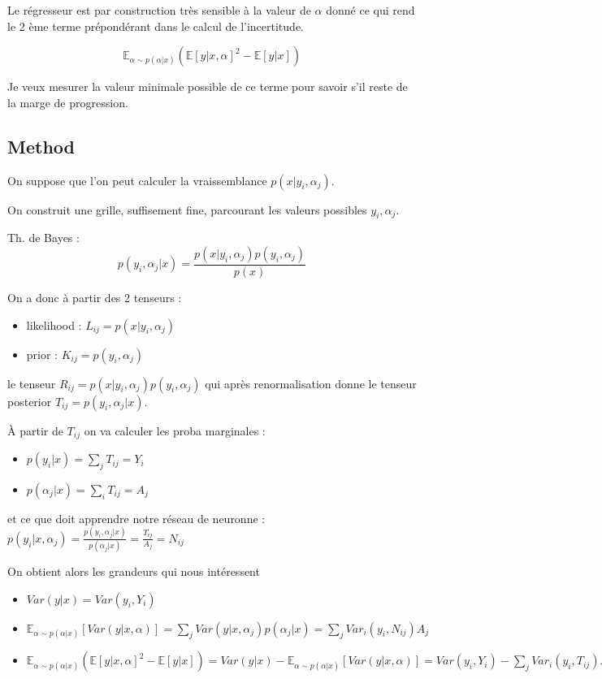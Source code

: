 Le régresseur est par construction très sensible à la valeur de $\alpha$ donné ce qui rend le 2 ème terme prépondérant dans le calcul de l'incertitude.

$$\mathbb E_{\alpha \sim p(\alpha|x)} \left (\mathbb E [y|x, \alpha]^2  - \mathbb E[y|x]\right )$$

Je veux mesurer la valeur minimale possible de ce terme pour savoir s'il reste de la marge de progression.

\subsection{Method} %
\label{sub:method}



On suppose que l'on peut calculer la vraissemblance $p(x|y_i, \alpha_j)$.

On construit une grille, suffisement fine, parcourant les valeurs possibles $y_i, \alpha_j$.

Th. de Bayes : 
$$
    p(y_i, \alpha_j | x) = \frac{p(x|y_i, \alpha_j) p(y_i, \alpha_j)}{p(x)}
$$

On a donc à partir des 2 tenseurs : 
\begin{itemize}
	\item likelihood : $L_{ij} = p(x|y_i, \alpha_j)$
	\item prior : $K_{ij} = p(y_i, \alpha_j)$ 
\end{itemize}

le tenseur $ R_{ij} = p(x|y_i, \alpha_j) p(y_i, \alpha_j) $ 
qui après renormalisation donne le tenseur posterior $ T_{ij} = p(y_i, \alpha_j | x)$.

À partir de $T_{ij}$ on va calculer les proba marginales :
\begin{itemize}
	\item $p(y_i | x) = \sum_j T_{ij} = Y_i$
	\item $p(\alpha_j | x) = \sum_i T_{ij} = A_j$
\end{itemize}

et ce que doit apprendre notre réseau de neuronne : $p(y_i | x, \alpha_j) = \frac{p(y_i, \alpha_j | x)}{p(\alpha_j | x)} = \frac{T_{ij}}{A_j} = N_{ij}$

On obtient alors les grandeurs qui nous intéressent
\begin{itemize}
	\item $ Var(y|x) = Var(y_i, Y_i) $
	\item $ \mathbb E_{\alpha \sim p(\alpha|x)}[ Var(y|x, \alpha) ] = \sum_j Var(y|x, \alpha_j) p(\alpha_j | x) = \sum_j Var_i(y_i, N_{ij}) A_j$
	\item $\mathbb E_{\alpha \sim p(\alpha|x)} \left (\mathbb E [y|x, \alpha]^2  - \mathbb E[y|x]\right ) = Var(y|x) - \mathbb E_{\alpha \sim p(\alpha|x)}[ Var(y|x, \alpha) ] = Var(y_i, Y_i) - \sum_j Var_i(y_i, T_{ij}) A_j$
\end{itemize}


